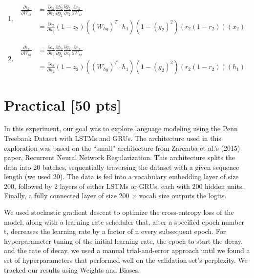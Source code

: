 \documentclass{article}
\begin{document}
\begin{enumerate}[label=\alph*.]
    \item
    \begin{equation*}
        \begin{aligned}
            \frac{\partial \epsilon_2}{\partial W_{xr}} &= \frac{\partial \epsilon_2}{\partial h_2} \frac{\partial h_2}{\partial g_2} \frac{\partial g_2}{\partial r_2} \frac{\partial r_2}{\partial W_{xr}} \\
            &= \frac{\partial \epsilon_2}{\partial h_2} (1-z_2)((W_{hg})^T \cdot h_1)(1-(g_2)^2)(r_2(1-r_2))(x_2)
        \end{aligned}
    \end{equation*}

    \item
    \begin{equation*}
        \begin{aligned}
            \frac{\partial \epsilon_2}{\partial W_{hr}} &= \frac{\partial \epsilon_2}{\partial h_2} \frac{\partial h_2}{\partial g_2} \frac{\partial g_2}{\partial r_2} \frac{\partial r_2}{\partial W_{hr}} \\
            &= \frac{\partial \epsilon_2}{\partial h_2} (1-z_2)((W_{hg})^T \cdot h_1)(1-(g_2)^2)(r_2(1-r_2))(h_1)
        \end{aligned}
    \end{equation*}
    
\end{enumerate}

\section{Practical [50 pts]}

In this experiment, our goal was to explore language modeling using the Penn Treebank Dataset with LSTMs and GRUs. The architecture used in this exploration was based on the “small” architecture from Zaremba et al.’s (2015) paper, Recurrent Neural Network Regularization. This architecture splits the data into 20 batches, sequentially traversing the dataset with a given sequence length (we used 20). The data is fed into a vocabulary embedding layer of size 200, followed by 2 layers of either LSTMs or GRUs, each with 200 hidden units. Finally, a fully connected layer of size 200 × vocab size outputs the logits.

We used stochastic gradient descent to optimize the cross-entropy loss of the model, along with a learning rate scheduler that, after a specified epoch number t, decreases the learning rate by a factor of n every subsequent epoch. For hyperparameter tuning of the initial learning rate, the epoch to start the decay, and the rate of decay, we used a manual trial-and-error approach until we found a set of hyperparameters that performed well on the validation set’s perplexity. We tracked our results using Weights and Biases.
\end{document}
